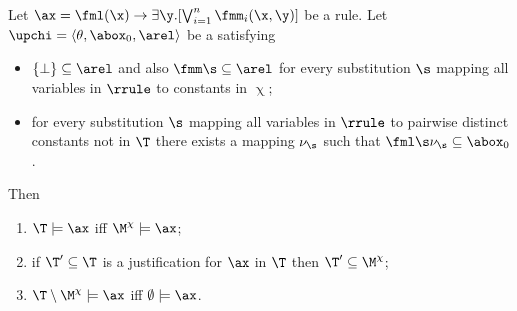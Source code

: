 \begin{proposition}
\label{prop:cqPreservation}
Let $\ax = \fml(\x)\to \exists \y.[\bigvee_{i=1}^n \fmm_i(\x,\y)]$ be a rule. 
Let $\upchi = \langle \theta, \abox_0, \arel \rangle$ be a \bla{} satisfying
\begin{itemize}
\item $\{\bot\}\subseteq \arel$ and also $\fmm\s\subseteq \arel$ for every substitution 
$\s$ mapping all variables in $\rrule$ to constants in $\upchi$;
\item for every substitution $\s$ mapping all variables in $\rrule$ to pairwise distinct constants not in $\T$ there exists 
a mapping $\nu_{\s}$ such that $\fml\s\nu_{\s}\subseteq\abox_0$. 
\end{itemize}
Then
\begin{enumerate}
\item $\T\models \ax$ iff $\M^{\chi}\models \ax$;
\item if $\T'\subseteq \T$ is a justification for $\ax$ in $\T$ then $\T'\subseteq\M^{\chi}$;
\item $\T\setminus\M^{\chi}\models \ax$ iff $\emptyset\models \ax$.
\end{enumerate}
\end{proposition}



